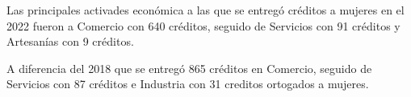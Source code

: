 Las principales activades económica a las que se entregó créditos a mujeres en el 2022 fueron a Comercio con 640 créditos, seguido de Servicios con 91 créditos y Artesanías con 9 créditos. 

A diferencia del 2018 que se entregó 865 créditos en Comercio, seguido de Servicios con 87 créditos e Industria con 31 creditos ortogados a mujeres. 